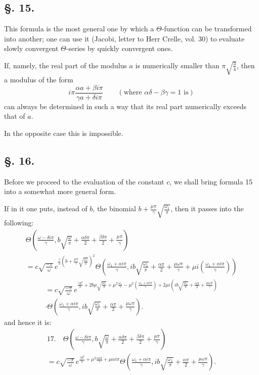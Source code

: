 \documentclass[10pt]{article}
\begin{document}
\subsection*{\S. 15.}
This formula is the most general one by which a \(\Theta\)-function can be transformed into another; one can use it (Jacobi, letter to Herr Crelle, vol. 30) to evaluate slowly convergent \(\Theta\)-series by quickly convergent ones.

If, namely, the real part of the modulus \(a\) is numerically smaller than \(\pi\sqrt{\frac{3}{4}}\), then a modulus of the form
\[
i\pi\frac{\alpha a+\beta i\pi}{\gamma a+\delta i\pi}
\qquad(\text{where }\alpha\delta-\beta\gamma=1\text{ is})
\]
can always be determined in such a way that its real part numerically exceeds that of \(a\).

In the opposite case this is impossible.

\subsection*{\S. 16.}
Before we proceed to the evaluation of the constant \(c\), we shall bring formula 15 into a somewhat more general form.

If in it one puts, instead of \(b\), the binomial \(b+\frac{\mu\pi}{\gamma}\sqrt{\frac{\omega_1}{\pi}}\), then it passes into the following:
\begin{multline*}
\Theta\!\left(\frac{\omega-\delta i\pi}{\gamma}, b\sqrt{\frac{\omega}{\pi}}+\frac{\alpha\delta\pi}{2}+\frac{\beta\delta\pi}{2}+\frac{\mu\pi}{\gamma}\right)\\
=c\sqrt{\frac{-\pi}{\omega}}\,e^{\frac{\gamma}{\pi}\left(b+\frac{\mu\pi}{\gamma}\sqrt{\frac{\omega_1}{\pi}}\right)^2}
\Theta\!\left(\frac{\omega_1+\alpha i\pi}{\gamma}, ib\sqrt{\frac{\omega_1}{\pi}}+\frac{\alpha\pi}{2}+\frac{\mu\omega\pi}{\gamma}+\mu i\left(\frac{\omega_1+\alpha i\pi}{\gamma}\right)\right)
\end{multline*}
\begin{multline*}
=c\sqrt{\frac{-\pi}{\omega}}\,
 e^{\frac{\gamma b^2}{\pi}+2b\mu\sqrt{\frac{\omega_1}{\pi}}+\mu^{2}\frac{\omega_1}{\gamma}-\mu^{2}\left(\frac{\omega_1+\alpha i\pi}{\gamma}\right)
+2\mu i\left(ib\sqrt{\frac{\omega_1}{\pi}}+\frac{\alpha\pi}{2}+\frac{\mu\omega\pi}{\gamma}\right)}\\
\cdot\Theta\!\left(\frac{\omega_1+\alpha i\pi}{\gamma}, ib\sqrt{\frac{\omega_1}{\pi}}+\frac{\alpha\pi}{2}+\frac{\mu\omega\pi}{\gamma}\right).
\end{multline*}
and hence it is:
\begin{multline*}
17.\quad
\Theta\!\left(\frac{\omega-\delta i\pi}{\gamma}, b\sqrt{\frac{\omega}{\pi}}+\frac{\alpha\delta\pi}{2}+\frac{\beta\delta\pi}{2}+\frac{\mu\pi}{\gamma}\right)\\
=c\sqrt{\frac{-\pi}{\omega}}\,e^{\frac{\gamma b^{2}}{\pi}+\mu^{2}\frac{\alpha i\pi}{\gamma}+\mu\alpha i\pi}
\Theta\!\left(\frac{\omega_1+\alpha i\pi}{\gamma}, ib\sqrt{\frac{\omega_1}{\pi}}+\frac{\alpha\pi}{2}+\frac{\mu\omega\pi}{\gamma}\right).
\end{multline*}
\end{document}
